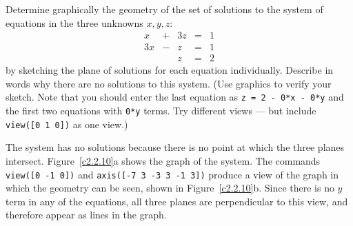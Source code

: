 \documentclass{ximera}
\begin{document}
\begin{computerExercise} \label{c2.2.10}
Determine graphically the geometry of the set of solutions to the
system of equations in the three unknowns $x,y,z$:
\[
\begin{array}{rcrcr}
  x & + & 3z  & = & 1\\
 3x & - &  z  & = & 1\\
    &   &  z  & = & 2
\end{array}
\]
by sketching the plane of solutions for each equation individually.
Describe in words why there are no solutions to this system.
(Use \Matlab graphics to verify your sketch.  Note that you should
enter the last equation as {\tt z = 2 - 0*x - 0*y} and the first two
equations with {\tt 0*y} terms.  Try different views --- but include
{\tt view([0 1 0])} as one view.)

\begin{solution}

The system has no solutions because there is no point at which the three
planes intersect.  Figure~\ref{c2.2.10}a shows the \Matlab graph of
the system.  The commands {\tt view([0 -1 0])} and 
{\tt axis([-7 3 -3 3 -1 3])}
produce a view of the graph in which the geometry
can be seen, shown in Figure~\ref{c2.2.10}b.
Since there is no $y$ term in any of the equations, all three planes
are perpendicular to this view, and therefore appear as lines in the
graph.

\begin{figure}[htb]
                       \centerline{%
                       }
\end{figure}





\end{solution}
\end{computerExercise}
\end{document}
